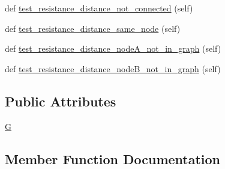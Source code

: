 \begin{DoxyCompactItemize}
\item 
def \hyperlink{classnetworkx_1_1algorithms_1_1tests_1_1test__distance__measures_1_1TestResistanceDistance_aa3e579518cc213af39e37fe2fbad03ff}{test\+\_\+resistance\+\_\+distance\+\_\+not\+\_\+connected} (self)
\item 
def \hyperlink{classnetworkx_1_1algorithms_1_1tests_1_1test__distance__measures_1_1TestResistanceDistance_a176c18d55f6df9570dd9f167ff74b879}{test\+\_\+resistance\+\_\+distance\+\_\+same\+\_\+node} (self)
\item 
def \hyperlink{classnetworkx_1_1algorithms_1_1tests_1_1test__distance__measures_1_1TestResistanceDistance_a30ce8a1b6d37bbd7bf9b6ffe1c3f7bba}{test\+\_\+resistance\+\_\+distance\+\_\+node\+A\+\_\+not\+\_\+in\+\_\+graph} (self)
\item 
def \hyperlink{classnetworkx_1_1algorithms_1_1tests_1_1test__distance__measures_1_1TestResistanceDistance_a261d0153e290004e68f789d0cfcbc312}{test\+\_\+resistance\+\_\+distance\+\_\+node\+B\+\_\+not\+\_\+in\+\_\+graph} (self)
\end{DoxyCompactItemize}
\subsection*{Public Attributes}
\begin{DoxyCompactItemize}
\item 
\hyperlink{classnetworkx_1_1algorithms_1_1tests_1_1test__distance__measures_1_1TestResistanceDistance_ac178e87117b316687710f593fd10457b}{G}
\end{DoxyCompactItemize}


\subsection{Member Function Documentation}
\mbox{\label{classnetworkx_1_1algorithms_1_1tests_1_1test__distance__measures_1_1TestResistanceDistance_a94f801325a51bf38d62a66271a718beb}} 
